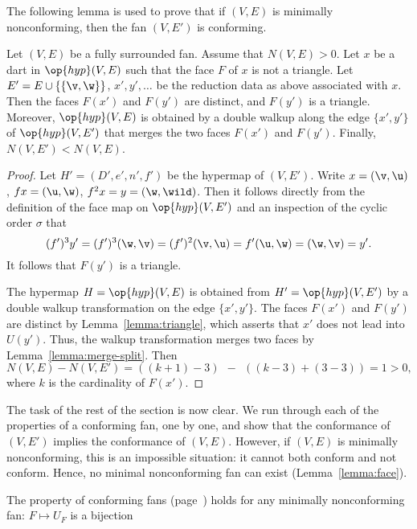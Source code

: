 The following lemma is used to prove that if $(V,E)$ is minimally nonconforming,
then the fan $(V,E')$ is conforming.

\begin{lemma}[]\cutrate{}\label{lemma:lessN}
  Let $(V,E)$ be a fully surrounded fan.  Assume that $N(V,E)>0$.  Let
  $x$ be a dart in $\op{hyp}(V,E)$ such that the face $F$ of $x$ is
  not a triangle.  Let $E'=E\cup \{\{\v,\w\}\}$, $x',y',\ldots$ be the reduction data
  as above associated with $x$.  Then the faces $F(x')$ and $F(y')$ are distinct, and
  $F(y')$ is a
  triangle. Moreover, $\op{hyp}(V,E)$ is obtained by a double walkup along the
  edge $\{x',y'\}$ of $\op{hyp}(V,E')$ that merges the two faces $F(x')$ and $F(y')$.
  Finally, $N(V,E')<N(V,E)$.
\end{lemma}


\begin{proof} Let $H'=(D',e',n',f')$ be the hypermap of $(V,E')$.
Write $x = (\v,\u)$, $f x = (\u,\w)$, $f^2 x = y = (\w,\wild )$.
Then it follows directly from the definition of the face map on $\op{hyp}(V,E')$
and an inspection of the cyclic order $\sigma$ that
\[ 
(f')^3 y' = (f')^3 (\w,\v) = (f')^2(\v,\u) = f' (\u,\w) = (\w,\v) = y'.
\] 
It follows that $F(y')$ is a triangle.

The hypermap $H=\op{hyp}(V,E)$ is obtained from $H'=\op{hyp}(V,E')$ by
a double walkup transformation on the edge $\{x',y'\}$.  The faces
$F(x')$ and $F(y')$ are distinct by Lemma~\ref{lemma:triangle}, which
asserts that $x'$ does not lead into $U(y')$.  Thus, the walkup
transformation merges two faces by Lemma~\ref{lemma:merge-split}.
Then
\[ N(V,E) - N(V,E') = ((k+1)-3) ~~-~~ ((k-3) +
(3-3)) = 1 >0,\]  where $k$ is the cardinality of
$F(x')$.
\end{proof}

The task of the rest of the section is now clear.  We run through each
of the properties of a conforming fan, one by one, and show that the
conformance of $(V,E')$ implies the conformance of $(V,E)$.  However,
if $(V,E)$ is minimally nonconforming, this is an impossible
situation: it cannot both conform and not conform.  Hence, no minimal
nonconforming fan can exist (Lemma~\ref{lemma:face}).

\begin{lemma}[bijection]\cutrate{}
The property  of conforming fans (page~\pageref{def:conforming}) 
holds for any
minimally nonconforming fan: $F\mapsto U_F$ is a bijection
\end{lemma}

